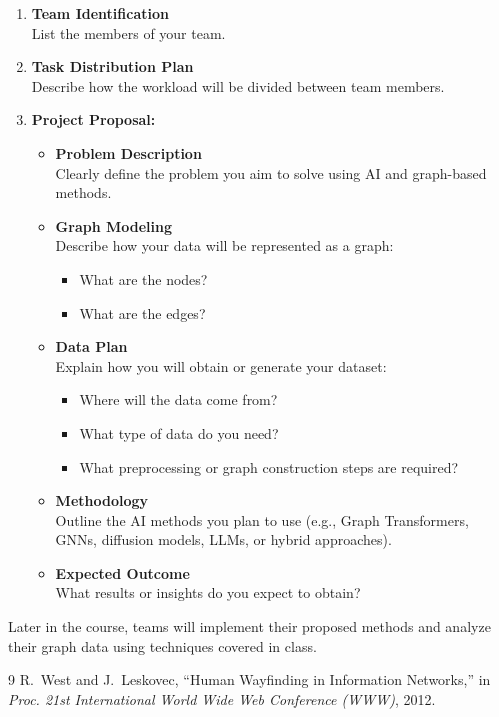 \documentclass{article}
\begin{document}
\begin{enumerate}[leftmargin=1.5em, label=\textbf{\arabic*.}]

\item \textbf{Team Identification}\\
List the members of your team.

\item \textbf{Task Distribution Plan}\\
Describe how the workload will be divided between team members.

\item \textbf{Project Proposal:}
\begin{itemize}[leftmargin=1.5em]

\item \textbf{Problem Description}\\
Clearly define the problem you aim to solve using AI and graph-based methods.

\item \textbf{Graph Modeling}\\
Describe how your data will be represented as a graph:
\begin{itemize}[leftmargin=1.5em]
    \item What are the nodes?
    \item What are the edges?
\end{itemize}

\item \textbf{Data Plan}\\
Explain how you will obtain or generate your dataset:
\begin{itemize}[leftmargin=1.5em]
    \item Where will the data come from?
    \item What type of data do you need?
    \item What preprocessing or graph construction steps are required?
\end{itemize}

\item \textbf{Methodology}\\
Outline the AI methods you plan to use (e.g., Graph Transformers, GNNs, diffusion models, LLMs, or hybrid approaches).

\item \textbf{Expected Outcome}\\
What results or insights do you expect to obtain?

\end{itemize}
\end{enumerate}

\vspace{0.5em}
\noindent Later in the course, teams will implement their proposed methods and analyze their graph data using techniques covered in class.

\newpage
\begin{thebibliography}{9}
R.~West and J.~Leskovec,
``Human Wayfinding in Information Networks,''
in \textit{Proc. 21st International World Wide Web Conference (WWW)}, 2012.
\end{thebibliography}
\end{document}

